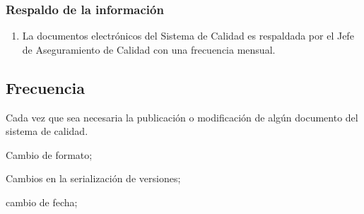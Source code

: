 \subsubsection{Respaldo de la información}
\begin{enumerate}
	\item La documentos electrónicos del Sistema de Calidad es respaldada por el Jefe de Aseguramiento de Calidad con una frecuencia mensual.
\end{enumerate}

\subsection{Frecuencia}
Cada vez que sea necesaria la publicación o modificación de algún documento del sistema de calidad.

\begin{changelog}[title=Registro de cambios,simple, sectioncmd=\subsection*,label=changelog-\thesection-\MayorVer.\MenorVer5]
	\begin{version}[v=\MayorVer.\MenorVer, date=2023--01, author=Pablo E. Alanis]
		\item Cambio de formato;
		\item Cambios en la serialización de versiones;
	\end{version}

	\begin{version}[v=1.6, date=2022--05, author=Alonso M.]
		\item cambio de fecha;
	\end{version}

\end{changelog}
